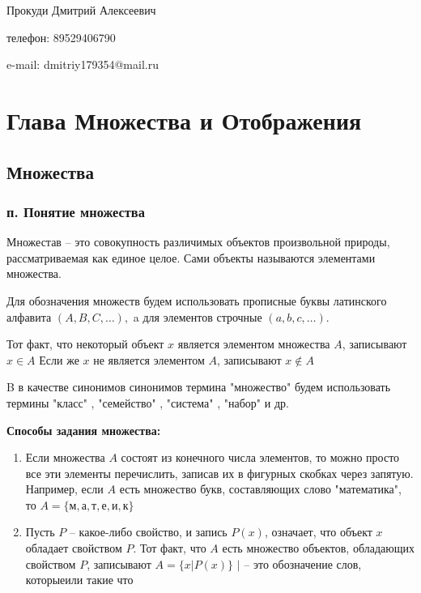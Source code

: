 


    Прокуди Дмитрий Алексеевич

    телефон: 89529406790

    e-mail: dmitriy179354@mail.ru 

    \section{Глава Множества и Отображения}
    \subsection{Множества}
    \subsubsection{п. Понятие множества}
    Множестав -- это совокупность различимых объектов произвольной природы,
    рассматриваемая как единое целое. Сами объекты называются элементами множества.

    Для обозначения множеств будем использовать прописные буквы латинского алфавита $(A, B, C,\ldots),$
    a для элементов строчные $(a, b, c, \ldots)$.

    Тот факт, что некоторый объект $x$ является элементом множества $A$, записывают 
    $x \in A $ Если же $x$ не является элементом $A$, записывают $x \notin A$

    B в качестве синонимов синонимов термина "множество" будем использовать термины 
    "класс" , "семейство" , "система" , "набор" и др.


    \textbf{Способы задания множества:}
    \begin{enumerate}
        \item Если множества $A$ состоят из конечного числа элементов,
        то можно просто все эти элементы перечислить, записав их в фигурных 
        скобках через запятую.
        Например, если $A$ есть множество букв, составляющих слово "математика", то
        $A = \{\text{м}, \text{а}, \text{т}, \text{е}, \text{и}, \text{к}\}$
        
        \item Пусть $P$ -- какое-либо свойство, и запись $P(x)$, означает, что объект
        $x$ обладает свойством $P$. Тот факт, что $A$ есть множество объектов,
        обладающих свойством $P$, записывают $A = \{x | P(x)\}$
        $|$ -- это обозначение слов, \glqq которые\grqq  или  \glqq такие что\grqq 
    \end{enumerate}

